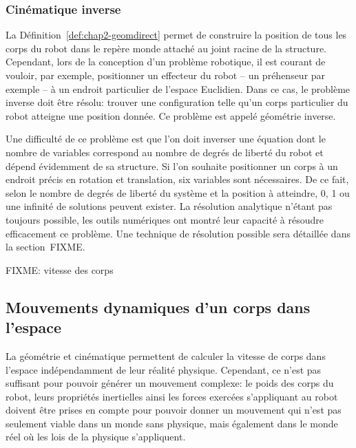 \subsubsection{Cinématique inverse}

La Définition~\autoref{def:chap2-geomdirect} permet de construire la
position de tous les corps du robot dans le repère monde attaché au
joint racine de la structure. Cependant, lors de la conception d'un
problème robotique, il est courant de vouloir, par exemple,
positionner un effecteur du robot -- un préhenseur par exemple -- à un
endroit particulier de l'espace Euclidien. Dans ce cas, le problème
inverse doit être résolu: trouver une configuration telle qu'un corps
particulier du robot atteigne une position donnée. Ce problème est
appelé géométrie inverse.


Une difficulté de ce problème est que l'on doit inverser une équation
dont le nombre de variables correspond au nombre de degrés de liberté
du robot et dépend évidemment de sa structure. Si l'on souhaite
positionner un corps à un endroit précis en rotation et translation,
six variables sont nécessaires. De ce fait, selon le nombre de degrés
de liberté du système et la position à atteindre, 0, 1 ou une infinité
de solutions peuvent exister. La résolution analytique n'étant pas
toujours possible, les outils numériques ont montré leur capacité à
résoudre efficacement ce problème. Une technique de résolution
possible sera détaillée dans la section~FIXME.

FIXME: vitesse des corps

\subsection{Mouvements dynamiques d'un corps dans l'espace}

La géométrie et cinématique permettent de calculer la vitesse de corps
dans l'espace indépendamment de leur réalité physique. Cependant, ce
n'est pas suffisant pour pouvoir générer un mouvement complexe: le
poids des corps du robot, leurs propriétés inertielles ainsi les
forces exercées s'appliquant au robot doivent être prises en compte
pour pouvoir donner un mouvement qui n'est pas seulement viable dans
un monde sans physique, mais également dans le monde réel où les lois
de la physique s'appliquent.

